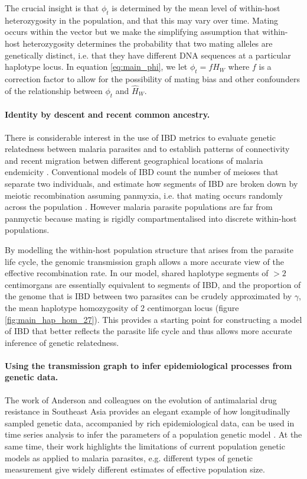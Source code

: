 \documentclass[_main.tex]{subfiles}
\begin{document}
The crucial insight is that $\phi_t$ is determined by the mean level of within-host heterozygosity in the population, and that this may vary over time.  Mating occurs within the vector but we make the simplifying assumption that within-host heterozygosity determines the probability that two mating alleles are genetically distinct, i.e. that they have different DNA sequences at a particular haplotype locus.  In equation \ref{eq:main_phi}, we let $\phi_t = f \widehat{H}_W$ where $f$ is a correction factor to allow for the possibility of mating bias and other confounders of the relationship between $\phi_t$ and $\widehat{H}_W$.

\paragraph{Identity by descent and recent common ancestry.}  \label{main_ibd_discussion}  

There is considerable interest in the use of IBD metrics to evaluate genetic relatedness between malaria parasites and to establish patterns of connectivity and recent migration betwen different geographical locations of malaria endemicity \cite{Schaffner2018,Henden2018,Taylor2017,Taylor2019,Taylor2020,Gerlovina2022}.  
 Conventional models of IBD count the number of meioses that separate two individuals, and estimate how segments of IBD are broken down by meiotic recombination assuming panmyxia, i.e. that mating occurs randomly across the population \cite{Browning2012}.  However malaria parasite populations are far from panmyctic because mating is rigidly compartmentalised into discrete within-host populations.  

By modelling the within-host population structure that arises from the parasite life cycle, the genomic transmission graph allows a more accurate view of the effective recombination rate.  In our model, shared haplotype segments of $>2$ centimorgans are essentially equivalent to segments of IBD, and the proportion of the genome that is IBD between two parasites can be crudely approximated by $\gamma$, the mean haplotype homozygosity of 2 centimorgan locus (figure \ref{fig:main_hap_hom_27}).  This provides a starting point for constructing a model of IBD that better reflects the parasite life cycle and thus allows more accurate inference of genetic relatedness. 

\paragraph{Using the transmission graph to infer epidemiological processes from genetic data.}  The work of Anderson and colleagues on the evolution of antimalarial drug resistance in Southeast Asia provides an elegant example of how longitudinally sampled genetic data, accompanied by rich epidemiological data, can be used in time series analysis to infer the parameters of a population genetic model \cite{Anderson2017}.  At the same time, their work highlights the limitations of current population genetic models as applied to malaria parasites, e.g. different types of genetic measurement give widely different estimates of effective population size.
\end{document}
